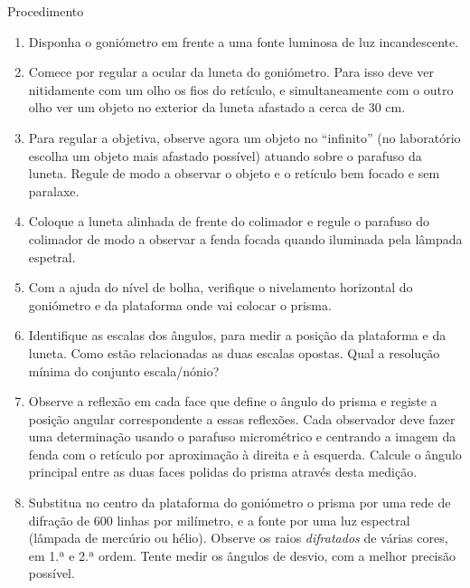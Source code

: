\documentclass[a4paper,12pt]{article}      %
\begin{document}
Procedimento
\begin{enumerate}
\item Disponha o goniómetro em frente a uma fonte luminosa de luz incandescente.
\item Comece por regular a ocular da luneta do goniómetro. Para isso deve ver nitidamente com um 
olho  os fios do retículo, e simultaneamente com o outro olho ver um objeto no exterior da luneta afastado a cerca de 30 cm.  
\item Para  regular  a  objetiva,  observe  agora  um  objeto  no  “infinito” (no  laboratório 
escolha  um objeto  mais  afastado possível)  atuando  sobre  o  parafuso  da  luneta.  Regule  de  modo  a 
observar o objeto e o retículo bem focado e sem paralaxe. 
\item Coloque  a  luneta  alinhada de frente  do  colimador  e  regule o parafuso  do 
colimador de modo a observar a fenda focada quando iluminada pela lâmpada espetral. 
\item Com a ajuda do nível de bolha, verifique o nivelamento horizontal do goniómetro e da plataforma onde vai colocar o prisma.
\item Identifique as escalas dos ângulos, para medir a posição da plataforma e da luneta. Como estão relacionadas as duas escalas opostas. Qual a resolução mínima do conjunto escala/nónio?
\item Observe a reflexão em cada face que define o ângulo do prisma e registe a posição angular 
correspondente a essas reflexões. Cada observador deve fazer uma determinação usando o 
parafuso  micrométrico e centrando  a  imagem  da  fenda  com  o retículo  por  aproximação  à direita e à esquerda. Calcule o ângulo principal entre as duas faces polidas do prisma através desta medição.
\item Substitua no centro da plataforma do goniómetro o prisma por uma rede de difração de 
600 linhas por milímetro, e a fonte por uma luz espectral (lâmpada de mercúrio ou hélio). Observe os raios \emph{difratados} de várias cores, em 1.ª e 2.ª ordem. Tente medir os ângulos de desvio, com a melhor precisão possível.

\end{enumerate}


	
\newpage
\def\width{18}
\def\hauteur{25}
\end{document}
